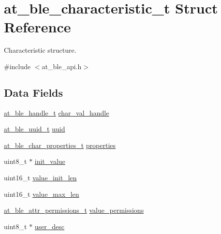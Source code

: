 \hypertarget{structat__ble__characteristic__t}{}\section{at\+\_\+ble\+\_\+characteristic\+\_\+t Struct Reference}
\label{structat__ble__characteristic__t}


Characteristic structure.  




{\ttfamily \#include $<$at\+\_\+ble\+\_\+api.\+h$>$}

\subsection*{Data Fields}
\begin{DoxyCompactItemize}
\item 
\mbox{\hyperlink{at__ble__api_8h_abd23646d0c662860741f787efc8456f2}{at\+\_\+ble\+\_\+handle\+\_\+t}} \mbox{\hyperlink{structat__ble__characteristic__t_a395cc1b8169d6bea42f786850fca098c}{char\+\_\+val\+\_\+handle}}
\item 
\mbox{\hyperlink{structat__ble__uuid__t}{at\+\_\+ble\+\_\+uuid\+\_\+t}} \mbox{\hyperlink{structat__ble__characteristic__t_a679a8e56540040619aee07eb7a743859}{uuid}}
\item 
\mbox{\hyperlink{at__ble__api_8h_a5f124b442695fa38f139ebe48167698d}{at\+\_\+ble\+\_\+char\+\_\+properties\+\_\+t}} \mbox{\hyperlink{structat__ble__characteristic__t_a0dafa6fd00ebd001cb8b6655e9806ed0}{properties}}
\item 
uint8\+\_\+t $\ast$ \mbox{\hyperlink{structat__ble__characteristic__t_a6b60846854939357f47bec6cc755fc56}{init\+\_\+value}}
\item 
uint16\+\_\+t \mbox{\hyperlink{structat__ble__characteristic__t_a1bdee23606d013941b6df78daad85fcb}{value\+\_\+init\+\_\+len}}
\item 
uint16\+\_\+t \mbox{\hyperlink{structat__ble__characteristic__t_aa72b9c8715f94b93b1eb97309917821f}{value\+\_\+max\+\_\+len}}
\item 
\mbox{\hyperlink{at__ble__api_8h_a5d87cd231ea3f9e11846dba7cf75eb61}{at\+\_\+ble\+\_\+attr\+\_\+permissions\+\_\+t}} \mbox{\hyperlink{structat__ble__characteristic__t_a7973bc0ef3b3e4a8860f82b22e515ffb}{value\+\_\+permissions}}
\item 
uint8\+\_\+t $\ast$ \mbox{\hyperlink{structat__ble__characteristic__t_af3b5cdae10fa0497c88f79ed49bc36f9}{user\+\_\+desc}}
\item 

\end{DoxyCompactItemize}
